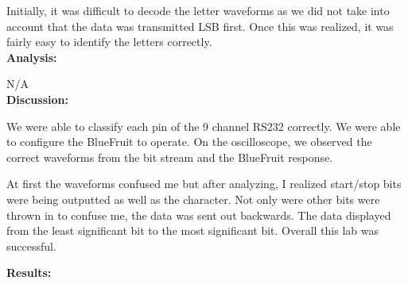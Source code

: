 \documentclass{article}
\begin{document}
Initially, it was difficult to decode the letter waveforms as we did not take into account that the data was transmitted LSB first. Once this was realized, it was fairly easy to identify the letters correctly.\\

\noindent\textbf{Analysis:}

N/A\\

\noindent\textbf{Discussion:}

We were able to classify each pin of the 9 channel RS232 correctly. We were able to configure the BlueFruit to operate. On the oscilloscope, we observed the correct waveforms from the bit stream and the BlueFruit response.

At first the waveforms confused me but after analyzing, I realized start/stop bits were being outputted as well as the character. Not only were other bits were thrown in to confuse me, the data was sent out backwards. The data displayed from the least significant bit to the most significant bit. Overall this lab was successful.


\noindent\textbf{Results:}
\end{document}
